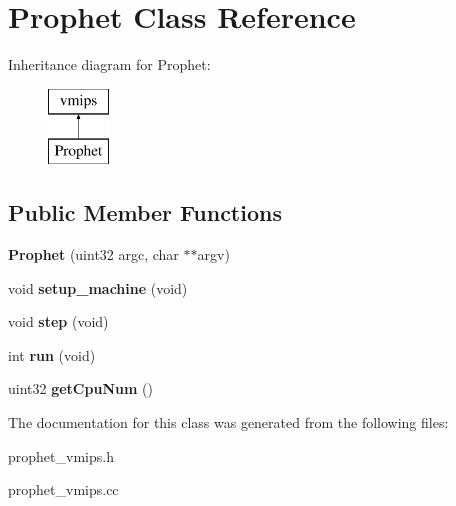 \hypertarget{classProphet}{
\section{Prophet Class Reference}
\label{classProphet}
}
Inheritance diagram for Prophet:\begin{figure}[H]
\begin{center}
\leavevmode
\includegraphics[height=2cm]{classProphet}
\end{center}
\end{figure}
\subsection*{Public Member Functions}
\begin{DoxyCompactItemize}
\item 
\hypertarget{classProphet_a57c6fa39fd79cacf5628304f85684139}{
{\bfseries Prophet} (uint32 argc, char $\ast$$\ast$argv)}
\label{classProphet_a57c6fa39fd79cacf5628304f85684139}

\item 
\hypertarget{classProphet_ae68eeb183488d3b2bd747e94ef28bc79}{
void {\bfseries setup\_\-machine} (void)}
\label{classProphet_ae68eeb183488d3b2bd747e94ef28bc79}

\item 
\hypertarget{classProphet_a268003f7e2637a524dfe893c9ca27089}{
void {\bfseries step} (void)}
\label{classProphet_a268003f7e2637a524dfe893c9ca27089}

\item 
\hypertarget{classProphet_abb3b6f1777aadb0a5b40c38a56ca36b9}{
int {\bfseries run} (void)}
\label{classProphet_abb3b6f1777aadb0a5b40c38a56ca36b9}

\item 
\hypertarget{classProphet_abe7eb928d0f643a21bc77c2db533ad63}{
uint32 {\bfseries getCpuNum} ()}
\label{classProphet_abe7eb928d0f643a21bc77c2db533ad63}

\end{DoxyCompactItemize}


The documentation for this class was generated from the following files:\begin{DoxyCompactItemize}
\item 
prophet\_\-vmips.h\item 
prophet\_\-vmips.cc\end{DoxyCompactItemize}
